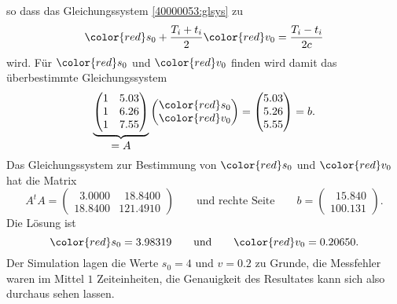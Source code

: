 \begin{loesung}
\[\]
so dass das Gleichungssystem \eqref{40000053:glsys}
zu 
\begin{equation}
{\color{red}s_0} + \frac{T_i+t_i}{2} {\color{red}v_0}
=
\frac{T_i-t_i}{2c}
\label{40000053:glsys2}
\end{equation}
wird.
Für 
$\color{red}s_0$
und
$\color{red}v_0$
finden wird damit das überbestimmte Gleichungssystem
\[
\underbrace{
\begin{pmatrix}
1&5.03\\
1&6.26\\
1&7.55
\end{pmatrix}
}_{\displaystyle=A}
\begin{pmatrix}
\color{red}s_0\\
\color{red}v_0
\end{pmatrix}
=
\begin{pmatrix}
5.03\\
5.26\\
5.55
\end{pmatrix}
=
b.
\]
Das Gleichungssystem zur Bestimmung von $\color{red}s_0$ und $\color{red}v_0$
hat die Matrix
\[
A^tA
=
\begin{pmatrix}
\phantom{0}3.0000&\phantom{0}18.8400\\
          18.8400&          121.4910
\end{pmatrix}
\qquad
\text{und rechte Seite}
\qquad
b
=
\begin{pmatrix}
   \phantom{0}15.840\\
             100.131
\end{pmatrix}.
\]
Die Lösung ist
\[
{\color{red}s_0} =    3.98319
\qquad\text{und}\qquad
{\color{red}v_0} =   0.20650.
\]
Der Simulation lagen die Werte $s_0=4$ und $v=0.2$ zu Grunde, die Messfehler
waren im Mittel $1$ Zeiteinheiten, die Genauigkeit des Resultates kann sich
also durchaus sehen lassen.
\end{loesung}

